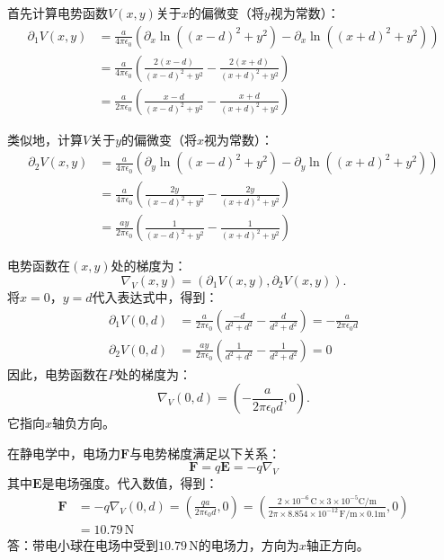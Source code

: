 \documentclass[12pt,UTF8]{ctexbook}
\begin{document}
\begin{so}
首先计算电势函数$V(x,y)$关于$x$的偏微变（将$y$视为常数）：
\begin{align*}
\partial_1 V(x,y) &= \frac{a}{4\pi\epsilon_0} \left( \partial_x \ln{\left( (x-d)^2+y^2\right)} - \partial_x \ln{\left( (x+d)^2+y^2\right)} \right) \\
&= \frac{a}{4\pi\epsilon_0} \left( \frac{2(x-d)}{(x-d)^2+y^2} - \frac{2(x+d)}{(x+d)^2+y^2} \right) \\
&= \frac{a}{2\pi\epsilon_0} \left( \frac{x-d}{(x-d)^2+y^2} - \frac{x+d}{(x+d)^2+y^2} \right)
\end{align*}

类似地，计算$V$关于$y$的偏微变（将$x$视为常数）：
\begin{align*}
\partial_2 V(x,y) &= \frac{a}{4\pi\epsilon_0} \left( \partial_y \ln{\left( (x-d)^2+y^2\right)} - \partial_y \ln{\left( (x+d)^2+y^2\right)} \right) \\
&= \frac{a}{4\pi\epsilon_0} \left( \frac{2y}{(x-d)^2+y^2} - \frac{2y}{(x+d)^2+y^2} \right) \\
&= \frac{a y}{2\pi\epsilon_0} \left( \frac{1}{(x-d)^2+y^2} - \frac{1}{(x+d)^2+y^2} \right)
\end{align*}

电势函数在$(x,y)$处的梯度为：
$$ \nabla_V(x,y) = \left(\partial_1 V(x,y), \partial_2 V(x, y)\right).$$
将$x=0$，$y=d$代入表达式中，得到：
\begin{align*}
\partial_1 V(0,d) &= \frac{a}{2\pi\epsilon_0} \left( \frac{-d}{d^2+d^2} - \frac{d}{d^2+d^2} \right) = -\frac{a}{2\pi\epsilon_0 d} \\
\partial_2 V(0,d) &=\frac{a y}{2\pi\epsilon_0} \left( \frac{1}{d^2+d^2} - \frac{1}{d^2+d^2} \right) = 0
\end{align*}
因此，电势函数在$P$处的梯度为：
$$ \nabla_V(0,d) = \left( -\frac{a}{2\pi\epsilon_0 d}, 0 \right).$$
它指向$x$轴负方向。

在静电学中，电场力$\mathbf{F}$与电势梯度满足以下关系：
$$ \mathbf{F} = q\mathbf{E} = -q\nabla_V $$
其中$\mathbf{E}$是电场强度。代入数值，得到：
\begin{align*}
\mathbf{F} &= -q\nabla_V(0,d) = \left( \frac{qa}{2\pi\epsilon_0 d}, 0 \right) =\left( \frac{2\times10^{-6}\,\mathrm{C} \times 3\times10^{-5}\mathrm{C/m} }{2\pi\times 8.854\times10^{-12}\,\mathrm{F/m}\times 0.1\mathrm{m}}, 0 \right)\\
&= 10.79\,\mathrm{N}
\end{align*}
答：带电小球在电场中受到$10.79\,\mathrm{N}$的电场力，方向为$x$轴正方向。
\end{so}
\end{document}
